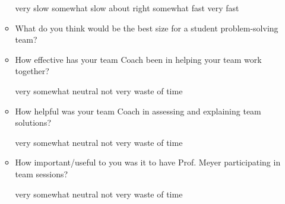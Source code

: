 \documentclass[handout]{mcs}
\begin{document}
\begin{itemize}
\begin{itemize}
\begin{center}
very slow\hspace{0.3in} somewhat slow\hspace{0.3in} about
right\hspace{0.3in} somewhat fast\hspace{0.3in} very fast
\end{center}

\item What do you think would be the best size for a student
  problem-solving team? \brule{0.5in}

\item How effective has your team Coach been in helping your team work
  together?

\begin{center}
very\hspace{0.5in} somewhat \hspace{0.5in} neutral\hspace{0.5in} not
very \hspace{0.5in} waste of time
\end{center}

\item How helpful was your team Coach in assessing and explaining team solutions?

\begin{center}
very\hspace{0.5in} somewhat \hspace{0.5in} neutral\hspace{0.5in} not
very \hspace{0.5in} waste of time
\end{center}

\iffalse
\item How helpful to you has the Instructor been during team sessions?

\begin{center}
very\hspace{0.5in} somewhat \hspace{0.5in} neutral\hspace{0.5in} not
very \hspace{0.5in} waste of time
\end{center}
\fi

\item How important/useful to you was it to have Prof. Meyer
  participating in team sessions?

\begin{center}
very\hspace{0.5in} somewhat \hspace{0.5in} neutral\hspace{0.5in} not
very \hspace{0.5in} waste of time
\end{center}


\end{itemize}
\end{itemize}
\end{document}

